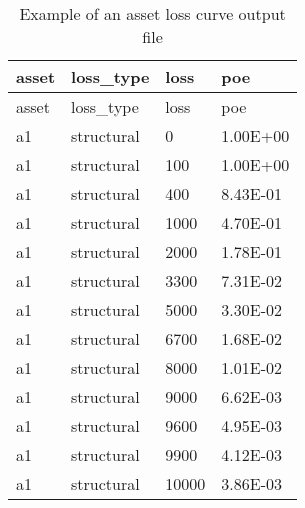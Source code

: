 \begin{table}[htbp]
\centering
\begin{tabular}{llll}

\hline
\rowcolor{lightgray}
\textbf{asset} & \textbf{loss\_type} & \textbf{loss} & \textbf{poe} \\
\hline
asset & loss\_type & loss  & poe      \\
a1    & structural & 0     & 1.00E+00 \\
a1    & structural & 100   & 1.00E+00 \\
a1    & structural & 400   & 8.43E-01 \\
a1    & structural & 1000  & 4.70E-01 \\
a1    & structural & 2000  & 1.78E-01 \\
a1    & structural & 3300  & 7.31E-02 \\
a1    & structural & 5000  & 3.30E-02 \\
a1    & structural & 6700  & 1.68E-02 \\
a1    & structural & 8000  & 1.01E-02 \\
a1    & structural & 9000  & 6.62E-03 \\
a1    & structural & 9600  & 4.95E-03 \\
a1    & structural & 9900  & 4.12E-03 \\
a1    & structural & 10000 & 3.86E-03 \\
\hline

\end{tabular}
\caption{Example of an asset loss curve output file}
\label{output:loss_curve_asset}
\end{table}